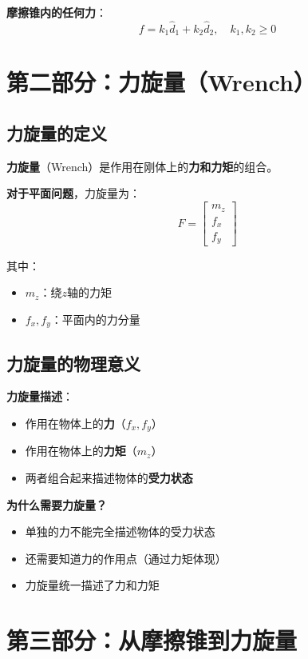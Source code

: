 \documentclass[12pt,a4paper]{article}
\begin{document}
\textbf{摩擦锥内的任何力}：
\begin{equation}
f = k_1 \hat{d}_1 + k_2 \hat{d}_2, \quad k_1, k_2 \geq 0
\end{equation}

\section{第二部分：力旋量（Wrench）}

\subsection{力旋量的定义}

\textbf{力旋量}（Wrench）是作用在刚体上的\textbf{力和力矩}的组合。

\textbf{对于平面问题}，力旋量为：
\begin{equation}
F = \begin{bmatrix} m_z \\ f_x \\ f_y \end{bmatrix}
\label{eq:wrench}
\end{equation}

其中：
\begin{itemize}
\item $m_z$：绕$z$轴的力矩
\item $f_x, f_y$：平面内的力分量
\end{itemize}

\subsection{力旋量的物理意义}

\textbf{力旋量描述}：
\begin{itemize}
\item 作用在物体上的\textbf{力}（$f_x, f_y$）
\item 作用在物体上的\textbf{力矩}（$m_z$）
\item 两者组合起来描述物体的\textbf{受力状态}
\end{itemize}

\textbf{为什么需要力旋量？}
\begin{itemize}
\item 单独的力不能完全描述物体的受力状态
\item 还需要知道力的作用点（通过力矩体现）
\item 力旋量统一描述了力和力矩
\end{itemize}

\section{第三部分：从摩擦锥到力旋量}
\end{document}
